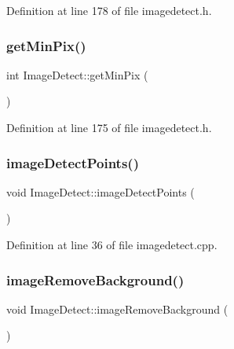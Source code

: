 Definition at line 178 of file imagedetect.\+h.

\mbox{\label{class_image_detect_ac0d3d2046393acd84b358ea653662456}} 
\subsubsection{\texorpdfstring{getMinPix()}{getMinPix()}}
{\footnotesize\ttfamily int Image\+Detect\+::get\+Min\+Pix (\begin{DoxyParamCaption}{ }\end{DoxyParamCaption})\hspace{0.3cm}{\ttfamily [inline]}}



Definition at line 175 of file imagedetect.\+h.

\mbox{\label{class_image_detect_a9a9779c213e8842fa7c4bdba59dc312e}} 
\subsubsection{\texorpdfstring{imageDetectPoints()}{imageDetectPoints()}}
{\footnotesize\ttfamily void Image\+Detect\+::image\+Detect\+Points (\begin{DoxyParamCaption}{ }\end{DoxyParamCaption})}



Definition at line 36 of file imagedetect.\+cpp.

\mbox{\label{class_image_detect_a6d6fc10052fa8bc5435d045046005c9c}} 
\subsubsection{\texorpdfstring{imageRemoveBackground()}{imageRemoveBackground()}}
{\footnotesize\ttfamily void Image\+Detect\+::image\+Remove\+Background (\begin{DoxyParamCaption}{ }\end{DoxyParamCaption})}



